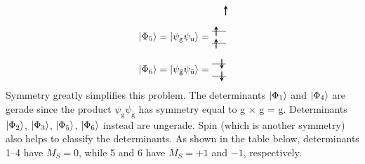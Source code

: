 \documentclass[../Main/chem532-notes.tex]{subfiles}
\begin{document}
\begin{align}
\begin{tikzpicture}[baseline={([yshift=-.5ex]current bounding box.center)},vertex/.style={anchor=base, minimum size=18pt, inner sep=2pt}]
    \draw[thick,->,>=stealth] (0.15,0.55) -- (0.15,0.9);
  \end{tikzpicture}\\[6pt]
      \ket{\Phi_5} = \ket{\psi_{\mathrm{g}}\psi_{\mathrm{u}}} 
=
  \begin{tikzpicture}[baseline={([yshift=-.5ex]current bounding box.center)},vertex/.style={anchor=base, minimum size=18pt, inner sep=2pt}]
    \draw (0,0.275) -- (0.5,0.275);
    \draw (0,0.725) -- (0.5,0.725);
    \draw[thick,->,>=stealth] (0.15,0.1) -- (0.15,0.45);
    \draw[thick,->,>=stealth] (0.15,0.55) -- (0.15,0.9);
  \end{tikzpicture}\\[6pt]
        \ket{\Phi_6} = \ket{\psi_{\bar{\mathrm{g}}}\psi_{\bar{\mathrm{u}}}} 
=
  \begin{tikzpicture}[baseline={([yshift=-.5ex]current bounding box.center)},vertex/.style={anchor=base, minimum size=18pt, inner sep=2pt}]
    \draw (0,0.275) -- (0.5,0.275);
    \draw (0,0.725) -- (0.5,0.725);
    \draw[thick,<-,>=stealth] (0.35,0.55) -- (0.35,0.9);
    \draw[thick,<-,>=stealth] (0.35,0.1) -- (0.35,0.45);
  \end{tikzpicture}
\end{align}
Symmetry greatly simplifies this problem.
The determinants $\ket{\Phi_1}$ and $\ket{\Phi_4}$ are gerade since the product $\psi_{\mathrm{g}}\psi_{\bar{\mathrm{g}}}$ has symmetry equal to g $\times$ g = g.
Determinants $\ket{\Phi_2}$, $\ket{\Phi_3}$, $\ket{\Phi_5}$, $\ket{\Phi_6}$ instead are ungerade.
Spin (which is another symmetry) also helps to classify the determinants.
As shown in the table below, determinants 1--4 have $M_S = 0$, while 5 and 6 have $M_S = +1$ and $-1$, respectively.
\end{document}

